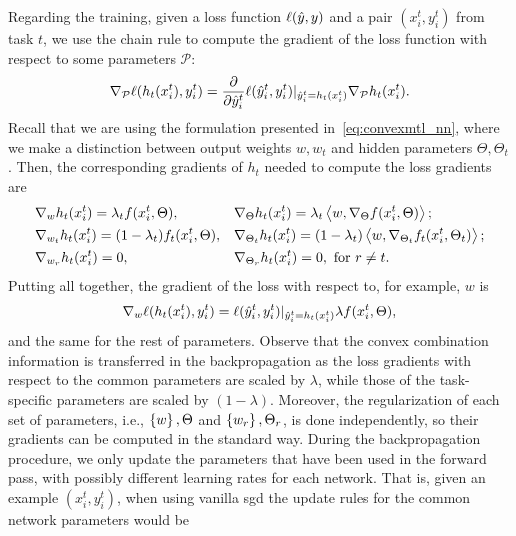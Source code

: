 Regarding the training, given a loss function $\ell(\hat{y}, y)$ and a pair $(x_i^t, y_i^t)$ from task $t$, we use the chain rule to compute the gradient of the loss function with respect to some parameters $\mathcal{P}$:
\begin{equation}
    \nonumber
    \nabla_\mathcal{P} \ell(h_t(x_i^t), y_i^t) = 
    \frac{\partial}{\partial \hat{y}_i^t} \ell(\hat{y}_i^t, y_i^t) \vert_{\hat{y}_i^t = h_t(x_i^t)} \nabla_\mathcal{P} h_t(x_i^t) .
\end{equation}
Recall that we are using the formulation presented in~\eqref{eq:convexmtl_nn},
where we make a distinction between output weights $w, w_t$ and hidden parameters $\Theta, \Theta_t$.
Then, the corresponding gradients of $h_t$ needed to compute the loss gradients are
\begin{equation}\label{eq:gradients_losses} 
    \begin{aligned}       
        &\nabla_{w} h_t(x_i^t)  
        = \lambda_t  f(x_i^t, \Theta) ,
        &&\nabla_{\Theta} h_t(x_i^t)  
        = \lambda_t  \dotp{w}{\nabla_\Theta f(x_i^t, \Theta)} ; \\
        &\nabla_{w_t} h_t(x_i^t)  
        = (1 - \lambda_t)  f_t(x_i^t, \Theta) ,
        &&\nabla_{\Theta_t} h_t(x_i^t)  
        = (1 - \lambda_t)   \dotp{w}{\nabla_{\Theta_t} f_t(x_i^t, \Theta_t)} ; \\
        &\nabla_{w_r} h_t(x_i^t)  
        =  0 , 
        &&\nabla_{\Theta_r} h_t(x_i^t)  
        =  0 , \text{ for } r \neq t .\\
    \end{aligned}    
\end{equation}
Putting all together, the gradient of the loss with respect to, for example, $w$ is 
$$  \nabla_w \ell(h_t(x_i^t), y_i^t)  =\ell(\hat{y}_i^t, y_i^t) \vert_{\hat{y}_i^t = h_t(x_i^t)} \lambda  f(x_i^t, \Theta) , $$
and the same for the rest of parameters.
%
Observe that the convex combination information is transferred in the backpropagation as the loss gradients with respect to the common parameters are scaled by $\lambda$, while those of the task-specific parameters are scaled by $(1 - \lambda)$.
%
Moreover, the regularization of each set of parameters, i.e., $\left\{w\right\}, \Theta$ and $\left\{w_r\right\}, \Theta_r$, is done independently, so their gradients can be computed in the standard way.
%
During the backpropagation procedure, we only update the parameters that have been used in the forward pass, with possibly different learning rates for each network. 
That is, given an example $(x_i^t, y_i^t)$, when using vanilla \acrfull{sgd} the update rules for the common network parameters would be
